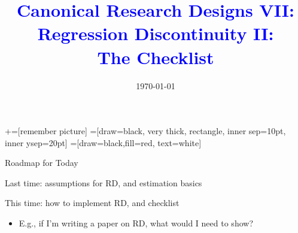 \documentclass[notes,11pt, aspectratio=169]{beamer}
\title[]{\textcolor{blue}{Canonical Research Designs VII:\\ Regression
    Discontinuity II:\\ The Checklist}} \author[PGP]{}
\institute[FRBNY]{\small{\begin{tabular}{c}
                           Paul Goldsmith-Pinkham  \\
\end{tabular}}}
\date{\today}
\newenvironment{wideitemize}{\itemize\addtolength{\itemsep}{10pt}}{\enditemize}
\begin{document}
\newcommand\marktopleft[1]{%
    \tikz[overlay,remember picture] 
        \node (marker-#1-a) at (-.3em,.3em) {};%
}
\newcommand\markbottomright[2]{%
    \tikz[overlay,remember picture] 
        \node (marker-#1-b) at (0em,0em) {};%
}
+=[remember picture] 
 =[draw=black, very thick, rectangle, inner sep=10pt, inner ysep=20pt]
 =[draw=black,fill=red, text=white]

\begin{frame}
\maketitle
\end{frame}

\begin{frame}{Roadmap for Today}
  \begin{wideitemize}
  \item Last time: assumptions for RD, and estimation basics
  \item This time: how to implement RD, and checklist
    \begin{itemize}
    \item E.g., if I'm writing a paper on RD, what would I need to show?
    \end{itemize}
  \end{wideitemize}
\end{frame}
\end{document}
